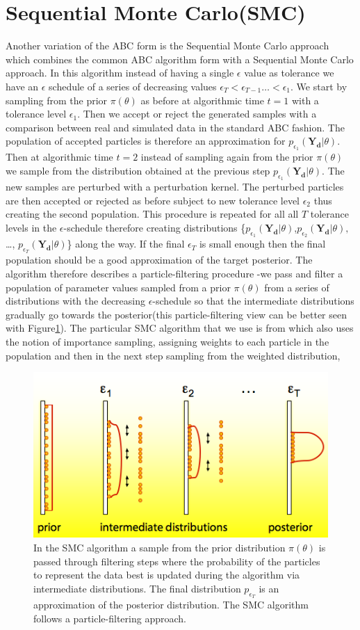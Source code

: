 \section{Sequential Monte Carlo(SMC)}
\label{sec:smc}
Another variation of the ABC form is the Sequential Monte Carlo approach\cite[] {toni2009abc} which combines the common ABC algorithm form with a Sequential Monte Carlo approach.  In this algorithm instead of having a single $\epsilon$ value as tolerance we have an $\epsilon$ schedule of a series of decreasing values $\epsilon_T < \epsilon_{T-1} \dots < \epsilon_{1}$. We start by sampling from the prior $\pi(\theta)$ as before at algorithmic time $t=1$ with a tolerance level $\epsilon_{1}$. Then we accept or reject the generated samples with a comparison between real and simulated data in the standard ABC fashion. The population of accepted particles is therefore an approximation for $p_{\epsilon_{1}}(\mathbf{Y_{d}}|\theta)$. Then at algorithmic time $t=2$ instead of sampling again from the prior $\pi(\theta)$ we sample from the distribution obtained at the previous step $p_{\epsilon_{1}}(\mathbf{Y_{d}}|\theta)$. The new samples are perturbed with a perturbation kernel. The perturbed particles are then accepted or rejected as before subject to new tolerance level $\epsilon_{2}$ thus creating the second population. This procedure is repeated for all all $T$ tolerance levels in the $\epsilon$-schedule therefore creating distributions \{$p_{\epsilon_{1}}(\mathbf{Y_{d}}|\theta)$,$p_{\epsilon_{2}}(\mathbf{Y_{d}}|\theta), $\dots, $p_{\epsilon_{T}}(\mathbf{Y_{d}}|\theta)$\} along the way. If the final $\epsilon_{T}$ is small enough then the final population should be a good approximation of the target posterior.  The algorithm therefore describes a particle-filtering procedure -we pass and filter a population of parameter values sampled from a prior $\pi(\theta)$  from a series of distributions with the decreasing $\epsilon$-schedule so that the intermediate distributions gradually go towards the posterior(this particle-filtering view can be better seen with Figure\ref{fig:smc}). The particular SMC algorithm that we use is from \cite[] {toni2009abc} which also uses the notion of importance sampling, assigning weights to each particle in the population and then in the next step sampling from the weighted distribution,
\begin{figure}
\centering
\includegraphics[width=0.5\linewidth]{ABCSMC}
\caption{In the SMC algorithm a sample from the prior distribution $\pi(\theta)$ is passed through filtering steps where the probability of the particles to represent the data best is updated during the algorithm via intermediate distributions. The final distribution $p_{\epsilon_{T}}$ is an approximation of the posterior distribution. The SMC  algorithm follows a particle-filtering approach.}
\label{fig:smc}
\end{figure}

